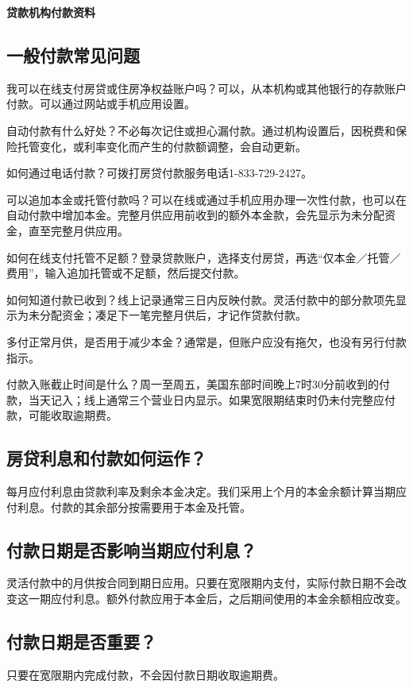 \documentclass[UTF8,fontset=none,11pt,a4paper]{ctexart}
\begin{document}
{\noindent\fontsize{20}{25}\selectfont\bfseries 贷款机构付款资料\par}
\vspace{10pt}
\subsection*{一般付款常见问题}
我可以在线支付房贷或住房净权益账户吗？可以，从本机构或其他银行的存款账户付款。可以通过网站或手机应用设置。


自动付款有什么好处？不必每次记住或担心漏付款。通过机构设置后，因税费和保险托管变化，或利率变化而产生的付款额调整，会自动更新。


如何通过电话付款？可拨打房贷付款服务电话1-833-729-2427。


可以追加本金或托管付款吗？可以在线或通过手机应用办理一次性付款，也可以在自动付款中增加本金。完整月供应用前收到的额外本金款，会先显示为未分配资金，直至完整月供应用。


如何在线支付托管不足额？登录贷款账户，选择支付房贷，再选“仅本金／托管／费用”，输入追加托管或不足额，然后提交付款。


如何知道付款已收到？线上记录通常三日内反映付款。灵活付款中的部分款项先显示为未分配资金；凑足下一笔完整月供后，才记作贷款付款。


多付正常月供，是否用于减少本金？通常是，但账户应没有拖欠，也没有另行付款指示。


付款入账截止时间是什么？周一至周五，美国东部时间晚上7时30分前收到的付款，当天记入；线上通常三个营业日内显示。如果宽限期结束时仍未付完整应付款，可能收取逾期费。


\subsection*{房贷利息和付款如何运作？}
每月应付利息由贷款利率及剩余本金决定。我们采用上个月的本金余额计算当期应付利息。付款的其余部分按需要用于本金及托管。


\subsection*{付款日期是否影响当期应付利息？}
灵活付款中的月供按合同到期日应用。只要在宽限期内支付，实际付款日期不会改变这一期应付利息。额外付款应用于本金后，之后期间使用的本金余额相应改变。


\subsection*{付款日期是否重要？}
只要在宽限期内完成付款，不会因付款日期收取逾期费。
\end{document}
